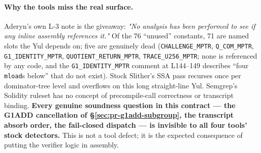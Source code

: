 \paragraph{Why the tools miss the real surface.}
Aderyn's own L-3 note is the giveaway: \emph{"No analysis has
been performed to see if any inline assembly references it."}
Of the 76 ``unused'' constants, 71 are named slots the Yul
depends on; five are genuinely dead (\texttt{CHALLENGE\_MPTR},
\texttt{Q\_COM\_MPTR}, \texttt{G1\_\allowbreak{}IDENTITY\_\allowbreak{}MPTR},
\texttt{QUOTIENT\_\allowbreak{}RETURN\_\allowbreak{}MPTR}, \texttt{TRACE\_U256\_MPTR}; none is
referenced by any code, and the
\texttt{G1\_\allowbreak{}IDENTITY\_\allowbreak{}MPTR} comment at L144--149 describes
``four \texttt{mload}s below'' that do not exist). Stock Slither's
SSA pass recurses once per dominator-tree level and overflows on
this long straight-line Yul. Semgrep's Solidity ruleset has
no concept of precompile-call correctness or transcript binding.
\textbf{Every genuine soundness question in this contract --- the
G1ADD cancellation of §\ref{sec:pr-g1add-subgroup}, the
transcript absorb order, the fail-closed dispatch --- is invisible
to all four tools' stock detectors.} This is not a tool defect; it is the expected
consequence of putting the verifier logic in assembly.

